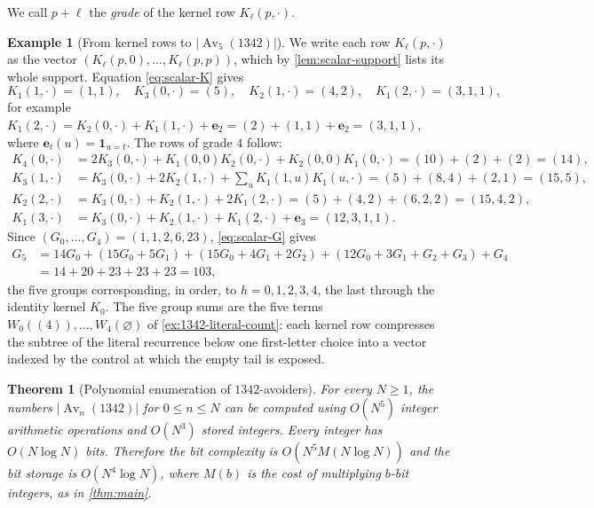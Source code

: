 \documentclass[11pt,reqno]{amsart}
\newtheorem{theorem}{Theorem}[section]
\theoremstyle{definition}
\newtheorem{example}[example]{Example}
\theoremstyle{remark}
\newcommand{\Av}{\operatorname{Av}}
\newcommand{\one}{\mathbf 1}
\begin{document}
We call $p+\ell$ the \emph{grade} of the kernel row $K_\ell(p,\mathord\cdot)$.

\begin{example}[From kernel rows to $\lvert\Av_5(1342)\rvert$]
\label{ex:scalar-kernel}
We write each row $K_\ell(p,\mathord\cdot)$ as the vector
$(K_\ell(p,0),\ldots,K_\ell(p,p))$, which by \cref{lem:scalar-support} lists
its whole support.  Equation \eqref{eq:scalar-K} gives
\[
 K_1(1,\mathord\cdot)=(1,1),\quad
 K_3(0,\mathord\cdot)=(5),\quad
 K_2(1,\mathord\cdot)=(4,2),\quad
 K_1(2,\mathord\cdot)=(3,1,1),
\]
for example
$K_1(2,\mathord\cdot)=K_2(0,\mathord\cdot)+K_1(1,\mathord\cdot)+\mathbf e_2
=(2)+(1,1)+\mathbf e_2=(3,1,1)$, where $\mathbf e_t(u)=\one_{u=t}$.  The
rows of grade $4$ follow:
\begin{align*}
 K_4(0,\mathord\cdot)&=2K_3(0,\mathord\cdot)
  +K_1(0,0)K_2(0,\mathord\cdot)+K_2(0,0)K_1(0,\mathord\cdot)=(10)+(2)+(2)=(14),\\
 K_3(1,\mathord\cdot)&=K_3(0,\mathord\cdot)+2K_2(1,\mathord\cdot)
  +\textstyle\sum_uK_1(1,u)K_1(u,\mathord\cdot)=(5)+(8,4)+(2,1)=(15,5),\\
 K_2(2,\mathord\cdot)&=K_3(0,\mathord\cdot)+K_2(1,\mathord\cdot)
  +2K_1(2,\mathord\cdot)=(5)+(4,2)+(6,2,2)=(15,4,2),\\
 K_1(3,\mathord\cdot)&=K_3(0,\mathord\cdot)+K_2(1,\mathord\cdot)
  +K_1(2,\mathord\cdot)+\mathbf e_3=(12,3,1,1).
\end{align*}
Since $(G_0,\ldots,G_4)=(1,1,2,6,23)$, \eqref{eq:scalar-G} gives
\begin{align*}
G_5
 &=14G_0+(15G_0+5G_1)+(15G_0+4G_1+2G_2)+(12G_0+3G_1+G_2+G_3)+G_4\\
 &=14+20+23+23+23=103,
\end{align*}
the five groups corresponding, in order, to $h=0,1,2,3,4$, the last through
the identity kernel $K_0$.  The five group sums are the five terms
$W_0((4)),\ldots,W_4(\varnothing)$ of \cref{ex:1342-literal-count}: each
kernel row compresses the subtree of the literal recurrence below one
first-letter choice into a vector indexed by the control at which the empty
tail is exposed.
\end{example}

\begin{theorem}[Polynomial enumeration of $1342$-avoiders]
\label{thm:scalar-algorithm}
For every $N\geq1$, the numbers
$\lvert\Av_n(1342)\rvert$ for $0\leq n\leq N$ can be computed using $O(N^5)$
integer arithmetic operations and $O(N^3)$ stored integers.  Every
integer has $O(N\log N)$ bits.  Therefore the bit complexity is
$O(N^5M(N\log N))$ and the bit storage is $O(N^4\log N)$, where $M(b)$ is
the cost of multiplying $b$-bit integers, as in \cref{thm:main}.
\end{theorem}
\end{document}
